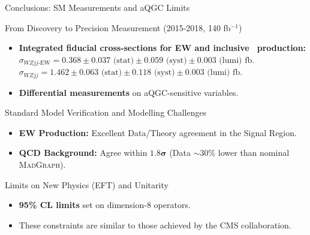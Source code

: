 \begin{frame}{Conclusions: SM Measurements and aQGC Limits}
    
    \begin{block}{From Discovery to Precision Measurement (2015-2018, 140 fb$^{-1}$)}
        \begin{itemize}
            \item \textbf{Integrated fiducial cross-sections for EW and inclusive \wzjj$\,$ production:} $\sigma_{WZjj\text{-EW}} = 0.368 \pm 0.037 \text{ (stat)} \pm 0.059 \text{ (syst)}\pm 0.003 \text{ (lumi)} \text{ fb}$.\\ 
            $\sigma_{WZjj} = 1.462 \pm 0.063 \text{ (stat)} \pm 0.118 \text{ (syst)}\pm 0.003 \text{ (lumi)} \text{ fb}$.
            \item \textbf{Differential measurements} on aQGC-sensitive variables.
        \end{itemize}
    \end{block}
    
    \begin{block}{Standard Model Verification and Modelling Challenges}
        \begin{itemize}
            \item \textbf{EW Production:} Excellent Data/Theory agreement in the Signal Region.
            \item \textbf{QCD Background:} Agree within $\mathbf{1.8\sigma}$ (Data $\sim 30\%$ lower than nominal \textsc{MadGraph}).
        \end{itemize}
    \end{block}

    {
    \begin{block}{Limits on New Physics (EFT) and Unitarity}
        \begin{itemize}
            \item \textbf{95\% CL limits} set on dimension-8 operators.
            \item These constraints are similar to those achieved by the CMS collaboration.
        \end{itemize}
    \end{block}
    }
\end{frame}









